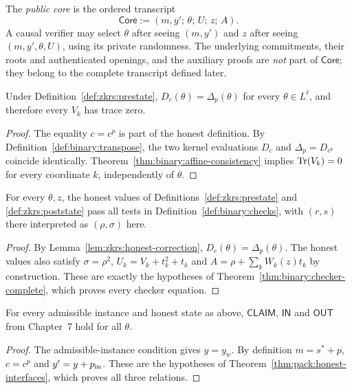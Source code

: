 \begin{definition}\label{def:zkrs:public-core}
The \emph{public core} is the ordered transcript
\[
 \mathsf{Core}:=(m,y';\,\theta;\,U;\,z;\,A).
\]
A causal verifier may select $\theta$ after seeing $(m,y')$
and $z$ after seeing $(m,y',\theta,U)$, using its private randomness.
The underlying commitments, their roots and authenticated openings,
and the auxiliary proofs are \emph{not} part of $\mathsf{Core}$;
they belong to the complete transcript defined later.
\end{definition}

\begin{lemma}\label{lem:zkrs:honest-correction}
Under Definition~\ref{def:zkrs:prestate},
$D_c(\theta)=\Delta_p(\theta)$ for every $\theta\in L^\ell$,
and therefore every $V_k$ has trace zero.
\end{lemma}
\begin{proof}
The equality $c=c^p$ is part of the honest definition.
By Definition~\ref{def:binary:transpose}, the two kernel
evaluations $D_c$ and $\Delta_p=D_{c^p}$ coincide identically.
Theorem~\ref{thm:binary:affine-consistency} implies
$\operatorname{Tr}(V_k)=0$ for every coordinate $k$, independently of $\theta$.
\end{proof}

\begin{lemma}\label{lem:zkrs:honest-checker}
For every $\theta,z$, the honest values of
Definitions~\ref{def:zkrs:prestate} and
\ref{def:zkrs:poststate} pass all tests in
Definition~\ref{def:binary:checks}, with
$(r,s)$ there interpreted as $(\rho,\sigma)$ here.
\end{lemma}
\begin{proof}
By Lemma~\ref{lem:zkrs:honest-correction},
$D_c(\theta)=\Delta_p(\theta)$.
The honest values also satisfy $\sigma=\rho^2$,
$U_k=V_k+t_k^2+t_k$ and
$A=\rho+\sum_kW_k(z)t_k$ by construction.
These are exactly the hypotheses of
Theorem~\ref{thm:binary:checker-complete},
which proves every checker equation.
\end{proof}

\begin{lemma}\label{lem:zkrs:honest-relations}
For every admissible instance and honest state as above,
$\mathsf{CLAIM}$, $\mathsf{IN}$ and $\mathsf{OUT}$ from
Chapter~7 hold for all $\theta$.
\end{lemma}
\begin{proof}
The admissible-instance condition gives $y=y_w$.
By definition $m=s^*+p$, $c=c^p$ and $y'=y+p_{\rm in}$.
These are the hypotheses of
Theorem~\ref{thm:pack:honest-interfaces},
which proves all three relations.
\end{proof}

